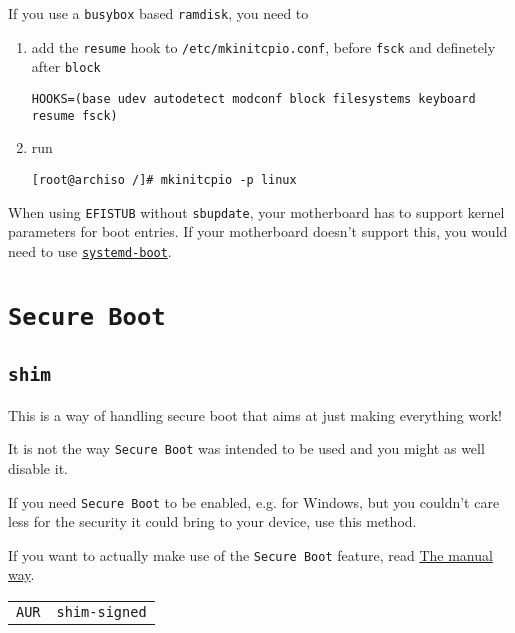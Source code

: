 \documentclass[9pt]{report}
\newenvironment{NOTE}
{\begin{tcolorbox}[colback=admonitionBG,coltitle=draculaFG,colframe=draculaBlue,colbacktitle=draculaBlue,title=NOTE]}
{\end{tcolorbox}}
\newenvironment{WARNING}
{\begin{tcolorbox}[colback=admonitionBG,coltitle=draculaBG,colframe=draculaOrange,colbacktitle=draculaOrange,title=WARNING]}
{\end{tcolorbox}}
\newenvironment{packagetable}
{\begin{longtabu}to \textwidth [b]{X[1,r]|X[1,l]}}
{\end{longtabu}}
\begin{document}
\begin{NOTE}
    If you use a \texttt{busybox} based \texttt{ramdisk}, you need to


    \begin{enumerate}

        \item{add the \texttt{resume} hook to \texttt{/etc/mkinitcpio.conf}, before \texttt{fsck} and definetely after \texttt{block}}

            \begin{verbatim}
HOOKS=(base udev autodetect modconf block filesystems keyboard resume fsck)
            \end{verbatim}
        \item{run}

            \begin{verbatim}
[root@archiso /]# mkinitcpio -p linux
            \end{verbatim}
    \end{enumerate}

\end{NOTE}
\begin{NOTE}
    When using \texttt{EFISTUB} without \texttt{sbupdate}, your motherboard has to support kernel parameters for boot entries.
    If your motherboard doesn’t support this, you would need to use \href{https://wiki.archlinux.org/index.php/Systemd-boot}{\texttt{systemd-boot}}.

\end{NOTE}

\newpage

\hypertarget{x-secure-boot}{\section{\texttt{Secure Boot}}}

\newpage

\hypertarget{x-shim}{\subsection{\texttt{shim}}}
\begin{WARNING}
    This is a way of handling secure boot that aims at just making everything work!


    It is not the way \texttt{Secure Boot} was intended to be used and you might as well disable it.


    If you need \texttt{Secure Boot} to be enabled, e.g. for Windows, but you couldn’t care less for the security it could bring to your device, use this method.


    If you want to actually make use of the \texttt{Secure Boot} feature, read \hyperlink{manual-secure-boot-setup}{The manual way}.

\end{WARNING}
\begin{packagetable}
    \texttt{AUR} & \texttt{shim-signed} \\ 
\end{packagetable}
\end{document}
